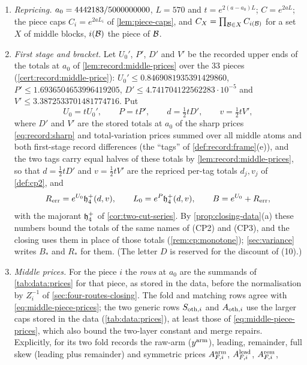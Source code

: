 \begin{definition}\label{def:closing-quantities}
\leavevmode
\begin{enumerate}[label=(\arabic*)]
\item \emph{Repricing.} $a_0=4442183/5000000000$, $L=570$ and $t=e^{2(a-a_0)L}$;
 $C=e^{2aL}$; the piece caps $C_i=e^{2aL_i}$ of \cref{lem:piece-caps}, and
 $C_X=\prod_{\mathcal B\in X}C_{i(\mathcal B)}$ for a set $X$ of middle blocks, $i(\mathcal B)$
 the piece of $\mathcal B$.
\item \emph{First stage and bracket.} Let $U_0'$, $P'$, $D'$ and $V'$ be the
 recorded upper ends of the totals at $a_0$ of \cref{lem:record:middle-prices}
 over the $33$ pieces (\cref{cert:record:middle-price}):
 $U_0'\le0.8469081935391429860$, $P'\le1.6936504653996419205$,
 $D'\le4.741704122562283\cdot10^{-5}$ and $V'\le3.3872533701481774716$. Put
 \[
  U_0=tU_0',\qquad P=tP',\qquad d=\tfrac12tD',\qquad v=\tfrac12tV',
 \]
 where $D'$ and $V'$ are the stored totals at $a_0$ of the sharp prices \eqref{eq:record:sharp} and total-variation prices summed over all middle atoms and both first-stage record differences (the ``tags'' of \cref{def:record:frame}(e)), and the two tags carry equal halves of these totals by \cref{lem:record:middle-prices}, so that $d=\tfrac12tD'$ and $v=\tfrac12tV'$ are the repriced per-tag totals $d_j,v_j$ of \cref{def:cp2}, and
 \[
  R_{\rm err}=e^{U_0}\mathfrak h_4^+(d,v),\qquad L_0=e^{P}\mathfrak h_4^+(d,v),\qquad
  B=e^{U_0}+R_{\rm err},
 \]
 with the majorant $\mathfrak h_4^+$ of \cref{cor:two-cut-series}. By
 \cref{prop:closing-data}(a) these numbers bound the totals of the same names
 of (CP2) and (CP3), and the closing uses them in place of those totals
 (\cref{rem:cp:monotone}); \cref{sec:variance} writes $B_*$ and $R_*$ for them.
 (The letter $D$ is reserved for the discount of (10).)
\item \emph{Middle prices.} For the piece $i$ the \emph{rows} at $a_0$ are the summands of \cref{tab:data:prices} for that piece, as stored in the data, before the normalisation by $Z_i^{-1}$ of \cref{sec:four-routes-closing}. The fold and matching rows agree with
 \eqref{eq:middle-piece-prices}; the two generic rows $S_{{\rm oth},i}$ and $A_{{\rm oth},i}$ use the larger caps stored in the data (\cref{tab:data:prices}), at least those of \eqref{eq:middle-piece-prices}, which also bound the two-layer
 constant and merge repairs.
 Explicitly, for its two
 fold records the raw-arm ($y^{\rm arm}$), leading, remainder, full skew (leading plus remainder) and symmetric prices
 $A^{\rm arm}_{F,i}$, $A^{\rm lead}_{F,i}$, $A^{\rm rem}_{F,i}$,

\end{enumerate}
\end{definition}
